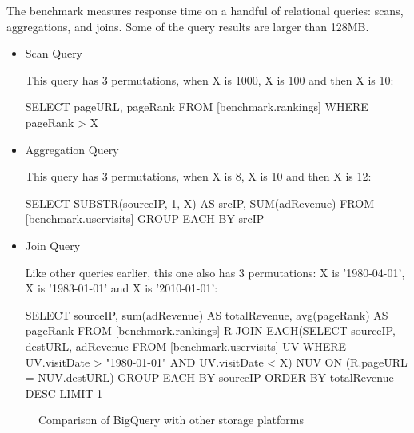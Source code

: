 \documentclass[9pt,twocolumn,twoside]{../../styles/osajnl}
\begin{document}
\noindent
The benchmark measures response time on a handful of relational
queries: scans, aggregations, and joins. Some of the query results are
larger than 128MB.
\begin{itemize}
\item Scan Query

This query has 3 permutations, when X is 1000, X is 100 and then X is 10:

SELECT pageURL, pageRank FROM [benchmark.rankings] WHERE pageRank > X


\item Aggregation Query

This query has 3 permutations, when X is 8, X is 10 and then X is 12:

SELECT SUBSTR(sourceIP, 1, X) AS srcIP, SUM(adRevenue)
FROM [benchmark.uservisits]
GROUP EACH BY srcIP


\item Join Query

Like other queries earlier, this one also has 3 permutations: X is ’1980-04-01’, X is ’1983-01-01’ and X is ’2010-01-01’:

SELECT sourceIP, sum(adRevenue) AS totalRevenue, avg(pageRank) AS pageRank
FROM [benchmark.rankings] R
JOIN EACH(SELECT sourceIP, destURL, adRevenue
FROM [benchmark.uservisits] UV WHERE UV.visitDate > "1980-01-01" AND UV.visitDate < X)
NUV ON (R.pageURL = NUV.destURL)
GROUP EACH BY sourceIP
ORDER BY totalRevenue DESC LIMIT 1
\end{itemize}

\begin{figure}[htbp]
\centering
{}
\caption{\cite{www-benchmarks-bigguery} Comparison of BigQuery with other storage platforms}
\label{fig:experiments}
\end{figure}
\end{document}
